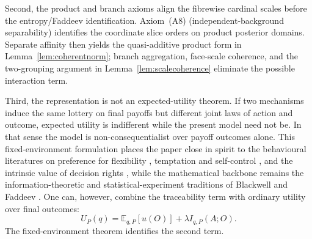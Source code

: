 \documentclass[11pt,a4paper]{article}
\theoremstyle{definition}
\newcommand{\E}{\mathbb E}
\newcommand{\1}{\mathbf 1}
\begin{document}
Second, the product and branch axioms align the fibrewise cardinal scales before the entropy/Faddeev identification.
Axiom~\textup{(A8)} (independent-background separability) identifies the coordinate slice orders on product posterior
domains.  Separate affinity then yields the quasi-additive product form in Lemma~\ref{lem:coherentnorm}; branch
aggregation, face-scale coherence, and the two-grouping argument in Lemma~\ref{lem:scalecoherence} eliminate the possible
interaction term.

Third, the representation is not an expected-utility theorem.  If two mechanisms induce the same lottery on final payoffs
but different joint laws of action and outcome, expected utility is indifferent while the present model need not be.  In that
sense the model is non-consequentialist over payoff outcomes alone.
This fixed-environment formulation places the paper close in spirit to the behavioural literatures on preference
for flexibility \cite{Kreps1979}, temptation and self-control \cite{GulPesendorfer2001}, and the intrinsic value of
decision rights \cite{BartlingFehrHerz2014}, while the mathematical backbone remains the information-theoretic and
statistical-experiment traditions of Blackwell \cite{Blackwell1953} and Faddeev \cite{Faddeev1956}.
One can, however, combine the traceability term with ordinary
utility over final outcomes:
\[
U_P(q)=\E_{q,P}[u(O)]+\lambda I_{q,P}(A;O).
\]
The fixed-environment theorem identifies the second term.
\end{document}
